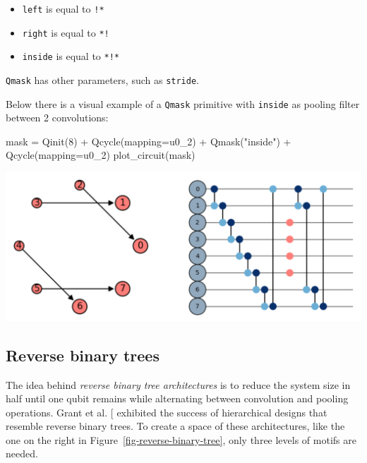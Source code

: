 \documentclass[
  13pt,
  a4paper,
  DIV=11,
  numbers=noendperiod]{scrreprt}
\newenvironment{Shaded}{\begin{snugshade}}{\end{snugshade}}
\newcommand{\DecValTok}[1]{\textcolor[rgb]{0.68,0.00,0.00}{#1}}
\newcommand{\NormalTok}[1]{\textcolor[rgb]{0.00,0.23,0.31}{#1}}
\newcommand{\OperatorTok}[1]{\textcolor[rgb]{0.37,0.37,0.37}{#1}}
\newcommand{\StringTok}[1]{\textcolor[rgb]{0.13,0.47,0.30}{#1}}
\providecommand{\tightlist}{%
  \setlength{\itemsep}{0pt}\setlength{\parskip}{0pt}}\usepackage{longtable,booktabs,array}
\begin{document}
\begin{itemize}
\tightlist
\item
  \texttt{left} is equal to \texttt{!*}
\item
  \texttt{right} is equal to \texttt{*!}
\item
  \texttt{inside} is equal to \texttt{*!*}
\end{itemize}

\texttt{Qmask} has other parameters, such as \texttt{stride}.

Below there is a visual example of a \texttt{Qmask} primitive with
\texttt{inside} as pooling filter between 2 convolutions:

\begin{Shaded}
\begin{Highlighting}[]
\NormalTok{mask }\OperatorTok{=}\NormalTok{ Qinit(}\DecValTok{8}\NormalTok{) }\OperatorTok{+}\NormalTok{ Qcycle(mapping}\OperatorTok{=}\NormalTok{u0\_2) }\OperatorTok{+}\NormalTok{ Qmask(}\StringTok{"inside"}\NormalTok{) }\OperatorTok{+}\NormalTok{ Qcycle(mapping}\OperatorTok{=}\NormalTok{u0\_2)}
\NormalTok{plot\_circuit(mask)}
\end{Highlighting}
\end{Shaded}

\includegraphics{chapters/../img/mask.png}

\subsection{Reverse binary trees}\label{sec-reverse-binary-trees}

The idea behind \emph{reverse binary tree architectures} is to reduce
the system size in half until one qubit remains while alternating
between convolution and pooling operations. Grant et al.
{[}\citeproc{ref-grant2018hierarchical}{7}{]} exhibited the success of
hierarchical designs that resemble reverse binary trees. To create a
space of these architectures, like the one on the right in
Figure~\ref{fig-reverse-binary-tree}, only three levels of motifs are
needed.
\end{document}
